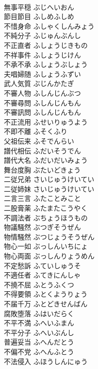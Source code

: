 \documentclass[8pt]{extreport}
\begin{document}
\begin{CJK}{UTF8}{min}
\\	無事平穏	ぶじへいおん	
\\	節目節目	ふしめふしめ	
\\	不惜身命	ふしゃくしんみょう	
\\	不純分子	ふじゅんぶんし	
\\	不正直者	ふしょうじきもの	
\\	不祥事件	ふしょうじけん	
\\	不承不承	ふしょうぶしょう	
\\	夫唱婦随	ふしょうふずい	
\\	武人気質	ぶじんかたぎ	
\\	不審人物	ふしんじんぶつ	
\\	不審尋問	ふしんじんもん	
\\	不審訊問	ふしんじんもん	
\\	不正流用	ふせいりゅうよう	
\\	不即不離	ふそくふり	
\\	父祖伝来	ふそでんらい	
\\	譜代相伝	ふだいそうでん	
\\	譜代大名	ふだいだいみょう	
\\	舞台度胸	ぶたいどきょう	
\\	二従兄弟	さいじゅうけいてい	
\\	二従姉妹	さいじゅうけいてい	
\\	二言三言	ふたことみこと	
\\	二股膏薬	ふたまたこうやく	
\\	不調法者	ぶちょうほうもの	
\\	物議騒然	ぶつぎそうぜん	
\\	物情騒然	ぶつじょうそうぜん	
\\	物心一如	ぶっしんいちにょ	
\\	物心両面	ぶっしんりょうめん	
\\	不定愁訴	ふていしゅうそ	
\\	不適任者	ふてきにんしゃ	
\\	不撓不屈	ふとうふくつ	
\\	不得要領	ふとくようりょう	
\\	不届千万	ふとどきせんばん	
\\	腐敗堕落	ふはいだらく	
\\	不平不満	ふへいふまん	
\\	不平分子	ふへいぶんし	
\\	普遍妥当	ふへんだとう	
\\	不偏不党	ふへんふとう	
\\	不法侵入	ふほうしんにゅう	

\end{CJK}
\end{document}
